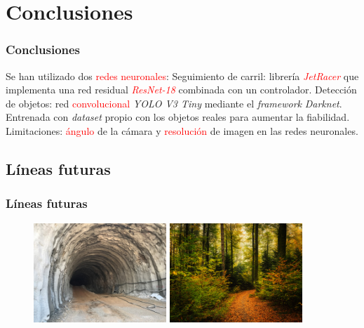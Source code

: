 \documentclass{beamer}
\begin{document}
\section{Conclusiones}
\begin{frame}
	\frametitle{Conclusiones}
	\begin{outline}
		\1 Se han utilizado dos \textcolor{red}{redes neuronales}:
		\2 Seguimiento de carril: librería \textcolor{red}{\textit{JetRacer}} que implementa una red residual \textcolor{red}{\textit{ResNet-18}} combinada con un
		controlador.
		\2 Detección de objetos: red \textcolor{red}{convolucional} \textit{YOLO V3 Tiny} mediante el \textit{framework} \textit{Darknet}. Entrenada con \textit{dataset}
		propio con los
		objetos reales para aumentar la fiabilidad.
		\1 Limitaciones: \textcolor{red}{ángulo} de la cámara y \textcolor{red}{resolución} de imagen en las redes neuronales.
	\end{outline}
\end{frame}

\subsection{Líneas futuras}
\begin{frame}
	\frametitle{Líneas futuras}
	\begin{figure}
		\centering
		\includegraphics[width=5cm]{figs/tunel}\hspace{0.5cm}
		\includegraphics[width=5cm]{figs/forest}
	\end{figure}
\end{frame}

\begin{frame}[plain]
	\large{\titlepage}
\end{frame}
\end{document}
